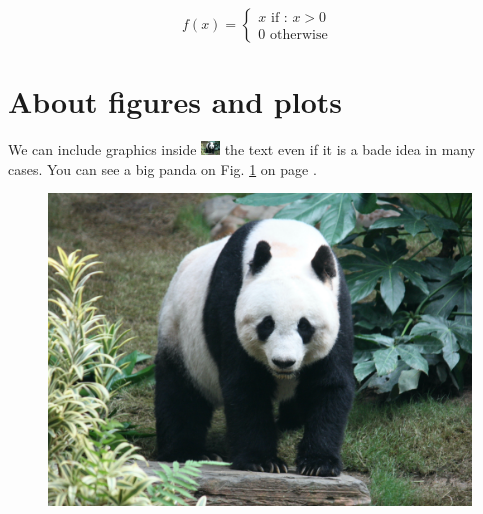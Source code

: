 \documentclass[10pt,a4paper]{article}
\begin{document}
\begin{equation}
    f(x) =
    \left\lbrace
    \begin{split}
        x \mbox{ if : } x > 0 \\
        0 \mbox { otherwise }
    \end{split}
    \right.
\end{equation}

\section{About figures and plots}

\blindtext[1]
We can include graphics inside
\includegraphics[width = 5mm]{figures/awesome_panda.jpeg}
the text even if it is a bade idea in many cases.
\blindtext[1]
You can see a big panda on Fig. \ref{fig:panda} on page \pageref{fig:panda}.

\begin{figure}
    \begin{center}
        \includegraphics[width = .5\textwidth]{figures/awesome_panda.jpeg}
    \end{center}
    \caption{\blindtext[1]}
    \label{fig:panda}
\end{figure}
\end{document}
